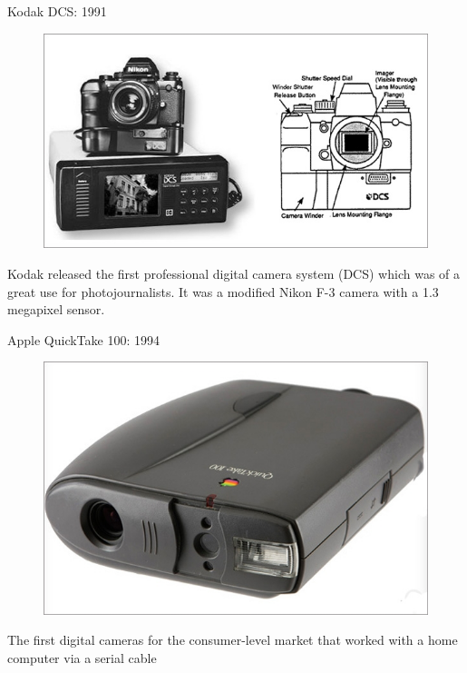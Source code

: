 \documentclass{beamer}
\begin{document}
	\begin{frame}{Kodak DCS: 1991}
		\begin{figure}
			\centering
			\includegraphics[scale=0.4]{133.jpg}
		\end{figure}
		Kodak released the first professional digital camera system (DCS) which was of a great use for photojournalists. It was a modified Nikon F-3 camera with a 1.3 megapixel sensor.
	\end{frame}
	\begin{frame}{Apple QuickTake 100: 1994}
		\begin{figure}
			\centering
			\includegraphics[scale=0.4]{134.jpg}
		\end{figure}
		The first digital cameras for the consumer-level market that worked with a home computer via a serial cable 
	\end{frame}
\end{document}
